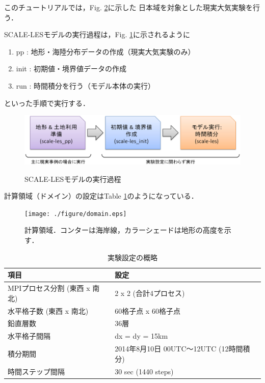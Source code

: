 
このチュートリアルでは，Fig. \ref{fig:domain}に示した
日本域を対象とした現実大気実験を行う．

SCALE-LESモデルの実行過程は，Fig. \ref{fig:howto}に示されるように
\begin{enumerate}
\item pp : 地形・海陸分布データの作成（現実大気実験のみ）
\item init : 初期値・境界値データの作成
\item run : 時間積分を行う（モデル本体の実行）
\end{enumerate}
といった手順で実行する．


\begin{figure}[h]
\begin{center}
  \includegraphics[width=0.9\hsize]{./figure/how_to_run.eps}\\
  \caption{SCALE-LESモデルの実行過程}
  \label{fig:howto}
\end{center}
\end{figure}

計算領域（ドメイン）の設定はTable \ref{tab:grids}のようになっている．

\begin{figure}[h]
\begin{center}
  \texttt{[image: ./figure/domain.eps]}\\
  \caption{計算領域．コンターは海岸線，カラーシェードは地形の高度を示す．}
  \label{fig:domain}
\end{center}
\end{figure}

\begin{table}[h]
\begin{center}
  \caption{実験設定の概略}
  \label{tab:grids}
  \begin{tabularx}{150mm}{|l|X|} \hline
    \rowcolor[gray]{0.9} 項目 & 設定 \\ \hline
    MPIプロセス分割 (東西 x 南北) & 2 x 2 (合計4プロセス) \\ \hline
    水平格子数 (東西 x 南北) & 60格子点 x 60格子点 \\ \hline
    鉛直層数                 & 36層                  \\ \hline
    水平格子間隔             & dx = dy = 15km       \\ \hline
    積分期間 & 2014年8月10日 00UTC～12UTC (12時間積分) \\ \hline
    時間ステップ間隔 & 30 sec (1440 steps) \\ \hline
  \end{tabularx}
\end{center}
\end{table}

